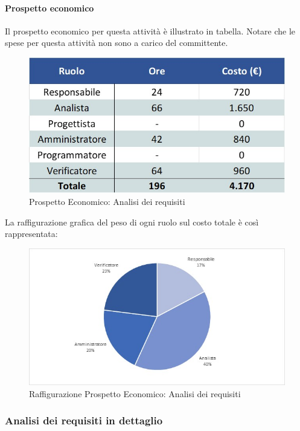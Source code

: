 \paragraph{Prospetto economico}
Il prospetto economico per questa attività è illustrato in tabella. Notare che le spese per questa attività non sono a carico del committente.
\begin{figure}[h!]
	\centerline{\includegraphics[scale=0.4]{img/Preventivo/AnalisiRequisitiEconomico.jpg}}
	\caption{Prospetto Economico: Analisi dei requisiti}
\end{figure}
La raffigurazione grafica del peso di ogni ruolo sul costo totale è così rappresentata: 
\begin{figure}[h!]
	\centerline{\includegraphics[scale=0.4]{img/Preventivo/Torte/AnalisiRequisiti.jpg}}
	\caption{Raffigurazione Prospetto Economico: Analisi dei requisiti}
\end{figure}

\subsubsection{Analisi dei requisiti in dettaglio}

